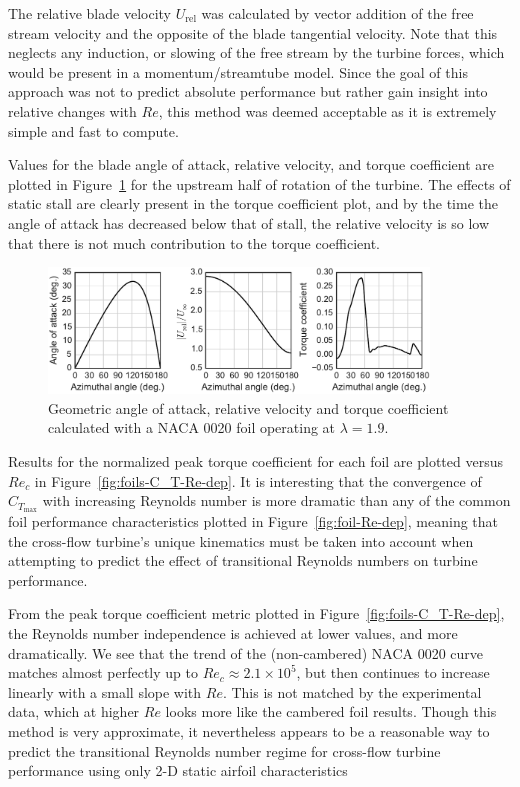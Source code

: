 \documentclass[energies,article,accept,moreauthors,pdftex,12pt,a4paper]{mdpi}
\begin{document}
The relative blade velocity $U_\mathrm{rel}$ was calculated by vector addition
of the free stream velocity and the opposite of the blade tangential velocity.
Note that this neglects any induction, or slowing of the free stream by the
turbine forces, which would be present in a momentum/streamtube model. Since the
goal of this approach was not to predict absolute performance but rather gain
insight into relative changes with $Re$, this method was deemed acceptable as it
is extremely simple and fast to compute.

Values for the blade angle of attack, relative velocity, and torque coefficient
are plotted in Figure~\ref{fig:blade-kinematics} for the upstream half of
rotation of the turbine. The effects of static stall are clearly present in the
torque coefficient plot, and by the time the angle of attack has decreased below
that of stall, the relative velocity is so low that there is not much
contribution to the torque coefficient.

\begin{figure}[ht!]
\centering

\includegraphics[width=0.9\textwidth]{figures/foil_kinematics_ct}

\caption{Geometric angle of attack, relative velocity and torque coefficient
    calculated with a NACA 0020 foil operating at $\lambda=1.9$.}

\label{fig:blade-kinematics}
\end{figure}

Results for the normalized peak torque coefficient for each foil are plotted
versus $Re_c$ in Figure~\ref{fig:foils-C_T-Re-dep}. It is interesting that the
convergence of $C_{T_\mathrm{max}}$ with increasing Reynolds number is more
dramatic than any of the common foil performance characteristics plotted in
Figure~\ref{fig:foil-Re-dep}, meaning that the cross-flow turbine's unique
kinematics must be taken into account when attempting to predict the effect of
transitional Reynolds numbers on turbine performance.

From the peak torque coefficient metric plotted in
Figure~\ref{fig:foils-C_T-Re-dep}, the Reynolds number independence is achieved
at lower values, and more dramatically. We see that the trend of the
(non-cambered) NACA 0020 curve matches almost perfectly up to $Re_c \approx 2.1
\times 10^5$, but then continues to increase linearly with a small slope with
$Re$. This is not matched by the experimental data, which at higher $Re$ looks
more like the cambered foil results. Though this method is very approximate, it
nevertheless appears to be a reasonable way to predict the transitional Reynolds
number regime for cross-flow turbine performance using only 2-D static airfoil
characteristics
\end{document}
